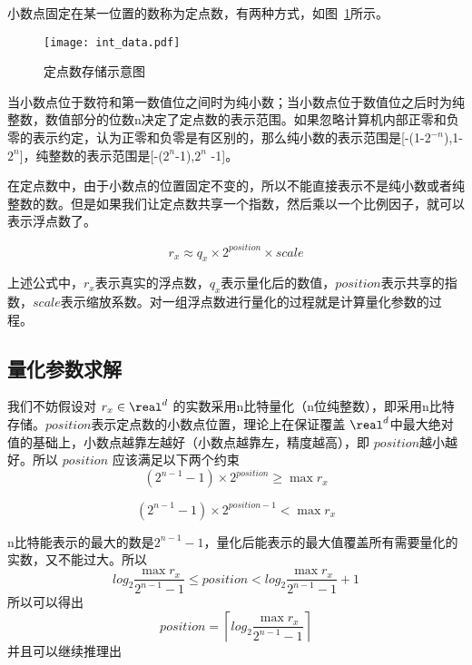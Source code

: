 小数点固定在某一位置的数称为定点数，有两种方式，如图~\ref{fig:int-data}所示。

\begin{figure}[htb]
  \centering
  \texttt{[image: int\_data.pdf]}
  \caption{定点数存储示意图}
  \label{fig:int-data}
\end{figure}

当小数点位于数符和第一数值位之间时为纯小数；当小数点位于数值位之后时为纯整数，数值部分的位数n决定了定点数的表示范围。如果忽略计算机内部正零和负零的表示约定，认为正零和负零是有区别的，那么纯小数的表示范围是[-(1-$2^{-n}$),1-$2^{n}$]，纯整数的表示范围是[{-($2^{n}$-1}),{$2^{n}$ -1}]。

在定点数中，由于小数点的位置固定不变的，所以不能直接表示不是纯小数或者纯整数的数。但是如果我们让定点数共享一个指数，然后乘以一个比例因子，就可以表示浮点数了。

\begin{equation}
  r_x \approx q_x \times 2^{position} \times scale
\end{equation}

上述公式中，$r_x$表示真实的浮点数，$q_x$表示量化后的数值，$position$表示共享的指数，$scale$表示缩放系数。对一组浮点数进行量化的过程就是计算量化参数的过程。

\subsection {量化参数求解}

我们不妨假设对 $r_x \in \real^d$ 的实数采用n比特量化（n位纯整数），即采用n比特存储。$position$表示定点数的小数点位置，理论上在保证覆盖 $\real^d$中最大绝对值的基础上，小数点越靠左越好（小数点越靠左，精度越高），即 $position$越小越好。所以 $position$ 应该满足以下两个约束\\

\begin{equation}
  {(2^{n-1} - 1)} \times 2^{position} \ge \max r_x 
\end{equation} 

\begin{equation}
  {(2^{n-1} - 1)} \times 2^{position - 1} < \max r_x 
\end{equation} 

n比特能表示的最大的数是$2^{n-1} - 1$，量化后能表示的最大值覆盖所有需要量化的实数，又不能过大。所以\\

\begin{equation}
 log_2 {\frac {\max r_x}{2^{n-1} -1}} \le position < log_2 {\frac {\max r_x}{2^{n-1} -1}} +1
\end{equation} 
所以可以得出\\
\begin{equation}
 position = \left \lceil log_2 {\frac {\max r_x}{2^{n-1} -1}} \right \rceil  
\end{equation} 
并且可以继续推理出\\

